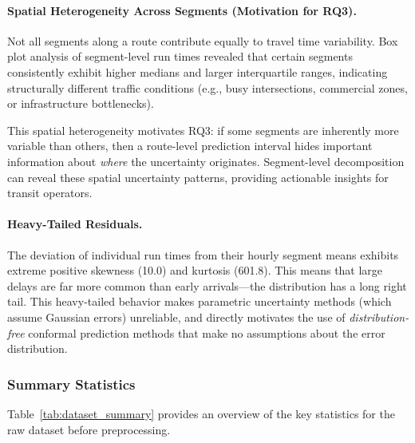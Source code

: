 \paragraph{Spatial Heterogeneity Across Segments (Motivation for RQ3).}
Not all segments along a route contribute equally to travel time variability. Box plot analysis of segment-level run times revealed that certain segments consistently exhibit higher medians and larger interquartile ranges, indicating structurally different traffic conditions (e.g., busy intersections, commercial zones, or infrastructure bottlenecks).

This spatial heterogeneity motivates RQ3: if some segments are inherently more variable than others, then a route-level prediction interval hides important information about \emph{where} the uncertainty originates. Segment-level decomposition can reveal these spatial uncertainty patterns, providing actionable insights for transit operators.

\paragraph{Heavy-Tailed Residuals.}
The deviation of individual run times from their hourly segment means exhibits extreme positive skewness (10.0) and kurtosis (601.8). This means that large delays are far more common than early arrivals—the distribution has a long right tail. This heavy-tailed behavior makes parametric uncertainty methods (which assume Gaussian errors) unreliable, and directly motivates the use of \emph{distribution-free} conformal prediction methods that make no assumptions about the error distribution.

\subsubsection{Summary Statistics}
\label{subsubsec:summary_stats}

Table~\ref{tab:dataset_summary} provides an overview of the key statistics for the raw dataset before preprocessing.

